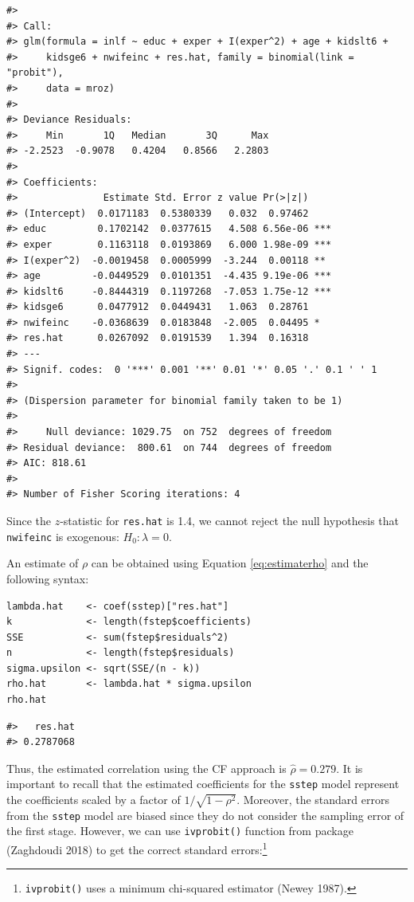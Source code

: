 \begin{verbatim}
#> 
#> Call:
#> glm(formula = inlf ~ educ + exper + I(exper^2) + age + kidslt6 + 
#>     kidsge6 + nwifeinc + res.hat, family = binomial(link = "probit"), 
#>     data = mroz)
#> 
#> Deviance Residuals: 
#>     Min       1Q   Median       3Q      Max  
#> -2.2523  -0.9078   0.4204   0.8566   2.2803  
#> 
#> Coefficients:
#>               Estimate Std. Error z value Pr(>|z|)    
#> (Intercept)  0.0171183  0.5380339   0.032  0.97462    
#> educ         0.1702142  0.0377615   4.508 6.56e-06 ***
#> exper        0.1163118  0.0193869   6.000 1.98e-09 ***
#> I(exper^2)  -0.0019458  0.0005999  -3.244  0.00118 ** 
#> age         -0.0449529  0.0101351  -4.435 9.19e-06 ***
#> kidslt6     -0.8444319  0.1197268  -7.053 1.75e-12 ***
#> kidsge6      0.0477912  0.0449431   1.063  0.28761    
#> nwifeinc    -0.0368639  0.0183848  -2.005  0.04495 *  
#> res.hat      0.0267092  0.0191539   1.394  0.16318    
#> ---
#> Signif. codes:  0 '***' 0.001 '**' 0.01 '*' 0.05 '.' 0.1 ' ' 1
#> 
#> (Dispersion parameter for binomial family taken to be 1)
#> 
#>     Null deviance: 1029.75  on 752  degrees of freedom
#> Residual deviance:  800.61  on 744  degrees of freedom
#> AIC: 818.61
#> 
#> Number of Fisher Scoring iterations: 4
\end{verbatim}

Since the \(z\)-statistic for \texttt{res.hat} is 1.4, we cannot reject the null hypothesis that \texttt{nwifeinc} is exogenous: \(H_0:\lambda = 0\).

An estimate of \(\rho\) can be obtained using Equation \eqref{eq:estimaterho} and the following syntax:

\begin{verbatim}
lambda.hat    <- coef(sstep)["res.hat"]
k             <- length(fstep$coefficients)
SSE           <- sum(fstep$residuals^2)
n             <- length(fstep$residuals)
sigma.upsilon <- sqrt(SSE/(n - k))
rho.hat       <- lambda.hat * sigma.upsilon
rho.hat
\end{verbatim}

\begin{verbatim}
#>   res.hat 
#> 0.2787068
\end{verbatim}

Thus, the estimated correlation using the CF approach is \(\widehat{\rho} = 0.279\). It is important to recall that the estimated coefficients for the \texttt{sstep} model represent the coefficients scaled by a factor of \(1 / \sqrt{1 - \rho^2}\). Moreover, the standard errors from the \texttt{sstep} model are biased since they do not consider the sampling error of the first stage. However, we can use \texttt{ivprobit()} function from  package (Zaghdoudi 2018) to get the correct standard errors:\footnote{\texttt{ivprobit()} uses a minimum chi-squared estimator (Newey 1987).}

